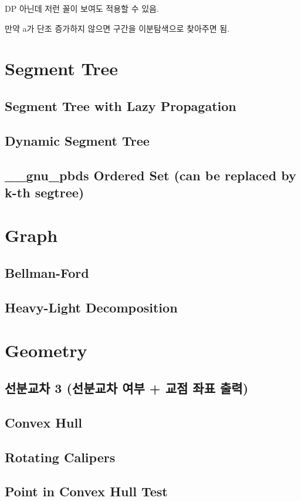 \documentclass[10pt,landscape,a4paper,twocolumn]{article}
\begin{document}
DP 아닌데 저런 꼴이 보여도 적용할 수 있음.

만약 a가 단조 증가하지 않으면 구간을 이분탐색으로 찾아주면 됨.

\section{Segment Tree}

\subsection{Segment Tree with Lazy Propagation}


\subsection{Dynamic Segment Tree}


\subsection{\_\_gnu\_pbds Ordered Set (can be replaced by k-th segtree)}


\section{Graph}

\subsection{Bellman-Ford}


\subsection{Heavy-Light Decomposition}


\section{Geometry}

\subsection{선분교차 3 (선분교차 여부 + 교점 좌표 출력)}


\subsection{Convex Hull}


\subsection{Rotating Calipers}


\subsection{Point in Convex Hull Test}

\end{document}
